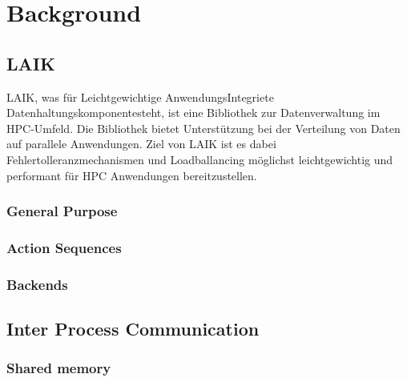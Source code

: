 
\chapter{Background}\label{chapter:background}

\section{LAIK}

LAIK, was für \glqq Leichtgewichtige AnwendungsIntegriete Datenhaltungskomponente\grqq steht, ist eine Bibliothek zur Datenverwaltung im HPC-Umfeld. Die Bibliothek bietet Unterstützung bei der Verteilung von Daten auf parallele Anwendungen. Ziel von LAIK ist es dabei Fehlertolleranzmechanismen und Loadballancing möglichst leichtgewichtig und performant für HPC Anwendungen bereitzustellen. 

\subsection{General Purpose}

\subsection{Action Sequences}

\subsection{Backends}

\section{Inter Process Communication}

\subsection{Shared memory}
